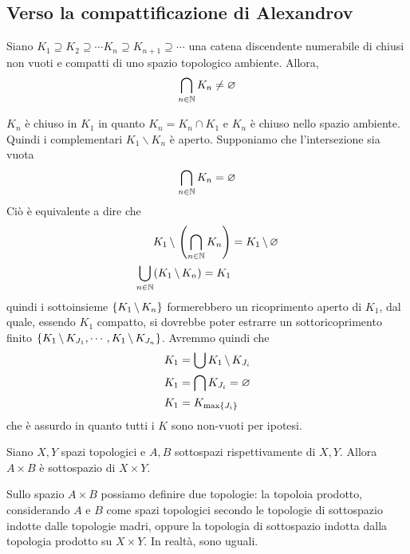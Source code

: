 \documentclass[a4paper]{article}
\begin{document}
\subsection{Verso la compattificazione di Alexandrov}

\begin{snippetproposition}{}
    Siano \(K_1 \supseteq K_2 \supseteq \cdots K_n \supseteq K_{n+1} \supseteq \cdots\)
    una catena discendente numerabile di chiusi non vuoti
    e compatti di uno spazio topologico ambiente. Allora,
    \[
        \bigcap_{n\in\mathbb{N}} K_n \neq \varnothing
    \]
\end{snippetproposition}

\begin{snippetproof}{}
    \(K_n\) è chiuso in \(K_1\) in quanto
    \(K_n = K_n \cap K_1\) e \(K_n\) è chiuso nello spazio ambiente.
    Quindi i complementari \(K_1 \backslash K_n\) è aperto.
    Supponiamo che l'intersezione sia vuota
    \[
        \bigcap_{n\in\mathbb{N}} K_n = \varnothing
    \]
    Ciò è equivalente a dire che
    \begin{align*}
        K_1 \,\backslash\, \left(\bigcap_{n\in\mathbb{N}} K_n\right) &= K_1 \,\backslash\, \varnothing \\
        \bigcup_{n\in\mathbb{N}} (K_1 \,\backslash\, K_n) = K_1
    \end{align*}
    quindi i sottoinsieme \(\{K_1 \,\backslash\, K_n\}\)
    formerebbero un ricoprimento aperto di \(K_1\),
    dal quale, essendo \(K_1\) compatto, si dovrebbe poter estrarre un sottoricoprimento
    finito \(\{K_1 \,\backslash\, K_{J_1}, \cdots, K_1 \,\backslash\, K_{J_n}\}\).
    Avremmo quindi che
    \begin{align*}
        K_1 &= \bigcup K_1 \,\backslash\, K_{J_i} \\
        K_1 &= \bigcap K_{J_i} = \varnothing \\
        K_1 &= K_{\max \{J_i\}}
    \end{align*}
    che è assurdo in quanto tutti i \(K\) sono non-vuoti per ipotesi.
\end{snippetproof}

\begin{snippetproposition}{}
    Siano \(X,Y\) spazi topologici e \(A,B\) sottospazi rispettivamente di \(X,Y\).
    Allora \(A \times B\) è sottospazio di \(X \times Y\).

    Sullo spazio \(A \times B\) possiamo definire due topologie:
    la topoloia prodotto, considerando \(A\) e \(B\) come spazi topologici
    secondo le topologie di sottospazio indotte dalle topologie madri,
    oppure la topologia di sottospazio indotta dalla topologia prodotto su \(X \times Y\).
    In realtà, sono uguali.
\end{snippetproposition}
\end{document}
